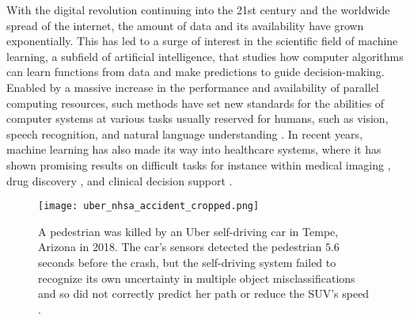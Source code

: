 With the digital revolution continuing into the 21st century and the worldwide spread of the internet, the amount of data and its availability have grown exponentially. 
This has led to a surge of interest in the scientific field of machine learning, a subfield of artificial intelligence, that studies how computer algorithms can learn functions from data and make predictions to guide decision-making. 
Enabled by a massive increase in the performance and availability of parallel computing resources, such methods have set new standards for the abilities of computer systems at various tasks usually reserved for humans, such as vision, speech recognition, and natural language understanding \parencite{lecun_deep_2015}. 
In recent years, machine learning has also made its way into healthcare systems, where it has shown promising results on difficult tasks for instance within medical imaging \parencite{lundervold_overview_2019}, drug discovery \parencite{chen_rise_2018}, and clinical decision support \parencite{cite15, cite14}. 

\begin{figure}[t]
    \centering
    \texttt{[image: uber\_nhsa\_accident\_cropped.png]}
    \caption[A pedestrian was killed by an Uber self-driving car in Tempe, Arizona in 2018.]{ A pedestrian was killed by an Uber self-driving car in Tempe, Arizona in 2018. The car's sensors detected the pedestrian $5.6$ seconds before the crash, but the self-driving system failed to recognize its own uncertainty in multiple object misclassifications and so did not correctly predict her path or reduce the SUV's speed \parencite[photo credit]{nationaltransportationsafetyboardnhsa_collision_2019}.}
    \label{fig:uber_nhsa_accident}
\end{figure}



